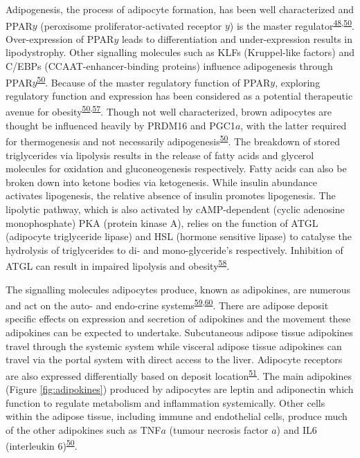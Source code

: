 \documentclass[11pt,twoside]{bristolthesis}
\begin{document}
Adipogenesis, the process of adipocyte formation, has been well characterized and PPAR\(y\) (peroxisome proliferator-activated receptor \(y\)) is the master regulator\textsuperscript{\protect\hyperlink{ref-Frayn2003}{48},\protect\hyperlink{ref-Luo2016}{50}}. Over-expression of PPAR\(y\) leads to differentiation and under-expression results in lipodystrophy. Other signalling molecules such as KLFs (Kruppel-like factors) and C/EBPs (CCAAT-enhancer-binding proteins) influence adipogenesis through PPAR\(y\)\textsuperscript{\protect\hyperlink{ref-Luo2016}{50}}. Because of the master regulatory function of PPAR\(y\), exploring regulatory function and expression has been considered as a potential therapeutic avenue for obesity\textsuperscript{\protect\hyperlink{ref-Luo2016}{50},\protect\hyperlink{ref-Lee2014}{57}}. Though not well characterized, brown adipocytes are thought be influenced heavily by PRDM16 and PGC1\(a\), with the latter required for thermogenesis and not necessarily adipogenesis\textsuperscript{\protect\hyperlink{ref-Luo2016}{50}}. The breakdown of stored triglycerides via lipolysis results in the release of fatty acids and glycerol molecules for oxidation and gluconeogenesis respectively. Fatty acids can also be broken down into ketone bodies via ketogenesis. While insulin abundance activates lipogenesis, the relative absence of insulin promotes lipogenesis. The lipolytic pathway, which is also activated by cAMP-dependent (cyclic adenosine monophosphate) PKA (protein kinase A), relies on the function of ATGL (adipocyte triglyceride lipase) and HSL (hormone sensitive lipase) to catalyse the hydrolysis of triglycerides to di- and mono-glyceride's respectively. Inhibition of ATGL can result in impaired lipolysis and obesity\textsuperscript{\protect\hyperlink{ref-Schreiber2019}{58}}.

The signalling molecules adipocytes produce, known as adipokines, are numerous and act on the auto- and endo-crine systems\textsuperscript{\protect\hyperlink{ref-Lehr2012}{59},\protect\hyperlink{ref-Fasshauer2015}{60}}. There are adipose deposit specific effects on expression and secretion of adipokines and the movement these adipokines can be expected to undertake. Subcutaneous adipose tissue adipokines travel through the systemic system while visceral adipose tissue adipokines can travel via the portal system with direct access to the liver. Adipocyte receptors are also expressed differentially based on deposit location\textsuperscript{\protect\hyperlink{ref-Kershaw2004}{51}}. The main adipokines (Figure \ref{fig:adipokines}) produced by adipocytes are leptin and adiponectin which function to regulate metabolism and inflammation systemically. Other cells within the adipose tissue, including immune and endothelial cells, produce much of the other adipokines such as TNF\(a\) (tumour necrosis factor \(a\)) and IL6 (interleukin 6)\textsuperscript{\protect\hyperlink{ref-Luo2016}{50}}.
\end{document}
